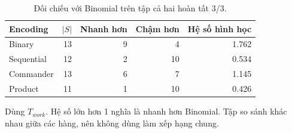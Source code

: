 \begin{table}[pos=H]
\centering
\small
\caption{Đối chiếu với Binomial trên tập cả hai hoàn tất 3/3.}
\label{tab:pairwise_binomial}
\setlength{\tabcolsep}{4pt}
\begin{tabular}{@{}lrrrr@{}}
\toprule
Encoding & $|S|$ & Nhanh hơn & Chậm hơn & Hệ số hình học \\
\midrule
Binary & 13 & 9 & 4 & 1.762 \\
Sequential & 12 & 2 & 10 & 0.534 \\
Commander & 13 & 6 & 7 & 1.145 \\
Product & 11 & 1 & 10 & 0.426 \\
\bottomrule
\end{tabular}
\par\smallskip\begin{minipage}{\linewidth}\footnotesize Dùng $T_{work}$. Hệ số lớn hơn 1 nghĩa là nhanh hơn Binomial. Tập so sánh khác nhau giữa các hàng, nên không dùng làm xếp hạng chung.\end{minipage}
\end{table}
